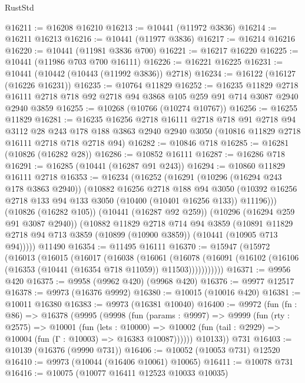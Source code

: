 \begin{lexlean}{RustStd}
\begin{coremodule}
@16211 := @16208 @16210
@16213 := @10441 (@11972 @3836)
@16214 := @16211 @16213
@16216 := @10441 (@11977 @3836)
@16217 := @16214 @16216
@16220 := @10441 (@11981 @3836 @700)
@16221 := @16217 @16220
@16225 := @10441 (@11986 @703 @700 @16111)
@16226 := @16221 @16225
@16231 := @10441 (@10442 (@10443 (@11992 @3836)) @2718)
@16234 := @16122 (@16127 (@16226 @16231))
@16235 := @10764 @11829
@16252 := @16235
    @11829
    @2718
    @16111
    @2718
    @718
    @92
    @2718
    @94
    @3868
    @105
    @259
    @91
    @714
    @3087
    @2940
    @2940
    @3859
@16255 := @10268 (@10766 (@10274 @10767))
@16256 := @16255 @11829
@16281 := @16235
    @16256
    @2718
    @16111
    @2718
    @718
    @91
    @2718
    @94
    @3112
    @28
    @243
    @178
    @188
    @3863
    @2940
    @2940
    @3050
    (@10816 @11829 @2718 @16111 @2718 @718 @2718 @94)
@16282 := @10846 @718
@16285 := @16281 (@10826 (@16282 @28))
@16286 := @10852 @16111
@16287 := @16286 @718
@16291 := @16285 (@10441 (@16287 @91 @243))
@16294 := @10860 @11829 @16111 @2718
@16353 := @16234
    (@16252
      (@16291
        (@10296 (@16294 @243 @178 @3863 @2940))
        (@10882
          @16256
          @2718
          @188
          @94
          @3050
          (@10392 @16256 @2718 @133 @94 @133 @3050 (@10400 (@10401 @16256 @133)) @11196)))
      (@10826 (@16282 @105))
      (@10441 (@16287 @92 @259))
      (@10296 (@16294 @259 @91 @3087 @2940))
      (@10882
        @11829
        @2718
        @714
        @94
        @3859
        (@10891 @11829 @2718 @94 @713 @3859 (@10899 (@10900 @3859)) (@10441 (@10905 @713 @94)))))
    @11490
@16354 := @11495 @16111
@16370 := @15947
    (@15972
      (@16013
        (@16015
          (@16017
            (@16038
              (@16061
                (@16078
                  (@16091 (@16102 (@16106 (@16353 (@10441 (@16354 @718 @11059)) @11503)))))))))))
@16371 := @9956 @420
@16375 := @9958 (@9962 @420) (@9968 @420)
@16376 := @9977 @12517
@16378 := @9973 (@16376 @9992)
@16380 := @10015 (@10016 @420)
@16381 := @10011 @16380
@16383 := @9973 (@16381 @10040)
@16400 := @9972
    (fun (fn : @86) =>
    @16378
      (@9995
        (@9998
          (fun (params : @9997) =>
          @9999
            (fun (rty : @2575) =>
            @10001
              (fun (lets : @10000) =>
              @10002 (fun (tail : @2929) => @10004 (fun (Γ : @10003) => @16383 @10087))))))
        @10133))
    @731
@16403 := @10139 (@16376 (@9990 @731))
@16406 := @10052 (@10053 @731) @12520
@16410 := @9973 (@10044 (@16406 @10061) @10065)
@16411 := @10078 @731
@16416 := @10075 (@10077 @16411 @12523 @10033 @10035)

\end{coremodule}
\end{lexlean}
